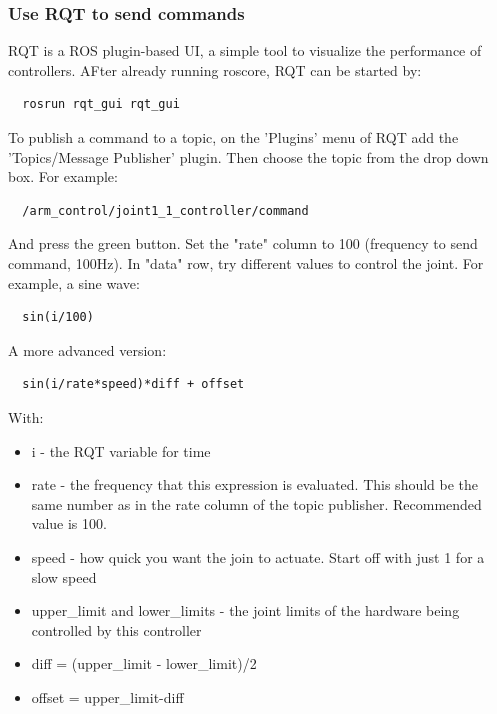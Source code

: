 \documentclass[pdftex,12pt,a4paper]{article}
\begin{document}
  \subsubsection{Use RQT to send commands}
  RQT is a ROS plugin-based UI, a simple tool to visualize the performance of controllers. AFter already running roscore, RQT can be started by:
  \begin{lstlisting}
  rosrun rqt_gui rqt_gui
  \end{lstlisting}
  To publish a command to a topic, on the 'Plugins' menu of RQT add the 'Topics/Message Publisher' plugin. Then choose the topic from the drop down box. For example:
  \begin{lstlisting}
  /arm_control/joint1_1_controller/command
  \end{lstlisting}
  And press the green button. Set the "rate" column to 100 (frequency to send command, 100Hz). In "data" row, try different values to control the joint. For example, a sine wave:
  \begin{lstlisting}
  sin(i/100)
  \end{lstlisting}
  A more advanced version:
  \begin{lstlisting}
  sin(i/rate*speed)*diff + offset
  \end{lstlisting}
  With:\\
  \begin{itemize}
  \item i - the RQT variable for time
  \item rate - the frequency that this expression is evaluated. This should be the same number as in the rate column of the topic publisher. Recommended value is 100.
  \item speed - how quick you want the join to actuate. Start off with just 1 for a slow speed
  \item upper\_limit and lower\_limits - the joint limits of the hardware being controlled by this controller
  \item diff = (upper\_limit - lower\_limit)/2
  \item offset = upper\_limit-diff
  \end{itemize}
  
  \newpage
\end{document}
